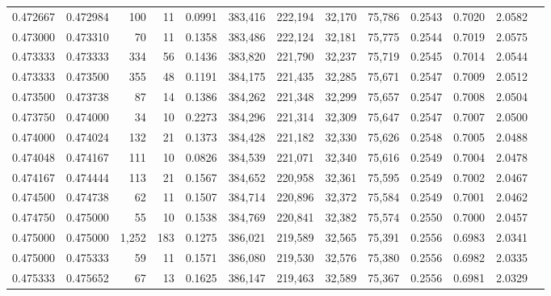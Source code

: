 \begin{tabular}{rrrrrrrrrrrrr}
0.472667 & 0.472984 &   100 &  11 &                                     0.0991 & 383,416 & 222,194 &  32,170 &  75,786 & 0.2543 & 0.7020 & 2.0582 \\
0.473000 & 0.473310 &    70 &  11 &                                     0.1358 & 383,486 & 222,124 &  32,181 &  75,775 & 0.2544 & 0.7019 & 2.0575 \\
0.473333 & 0.473333 &   334 &  56 &                                     0.1436 & 383,820 & 221,790 &  32,237 &  75,719 & 0.2545 & 0.7014 & 2.0544 \\
0.473333 & 0.473500 &   355 &  48 &                                     0.1191 & 384,175 & 221,435 &  32,285 &  75,671 & 0.2547 & 0.7009 & 2.0512 \\
0.473500 & 0.473738 &    87 &  14 &                                     0.1386 & 384,262 & 221,348 &  32,299 &  75,657 & 0.2547 & 0.7008 & 2.0504 \\
0.473750 & 0.474000 &    34 &  10 &                                     0.2273 & 384,296 & 221,314 &  32,309 &  75,647 & 0.2547 & 0.7007 & 2.0500 \\
0.474000 & 0.474024 &   132 &  21 &                                     0.1373 & 384,428 & 221,182 &  32,330 &  75,626 & 0.2548 & 0.7005 & 2.0488 \\
0.474048 & 0.474167 &   111 &  10 &                                     0.0826 & 384,539 & 221,071 &  32,340 &  75,616 & 0.2549 & 0.7004 & 2.0478 \\
0.474167 & 0.474444 &   113 &  21 &                                     0.1567 & 384,652 & 220,958 &  32,361 &  75,595 & 0.2549 & 0.7002 & 2.0467 \\
0.474500 & 0.474738 &    62 &  11 &                                     0.1507 & 384,714 & 220,896 &  32,372 &  75,584 & 0.2549 & 0.7001 & 2.0462 \\
0.474750 & 0.475000 &    55 &  10 &                                     0.1538 & 384,769 & 220,841 &  32,382 &  75,574 & 0.2550 & 0.7000 & 2.0457 \\
0.475000 & 0.475000 & 1,252 & 183 &                                     0.1275 & 386,021 & 219,589 &  32,565 &  75,391 & 0.2556 & 0.6983 & 2.0341 \\
0.475000 & 0.475333 &    59 &  11 &                                     0.1571 & 386,080 & 219,530 &  32,576 &  75,380 & 0.2556 & 0.6982 & 2.0335 \\
0.475333 & 0.475652 &    67 &  13 &                                     0.1625 & 386,147 & 219,463 &  32,589 &  75,367 & 0.2556 & 0.6981 & 2.0329 \\

\end{tabular}

